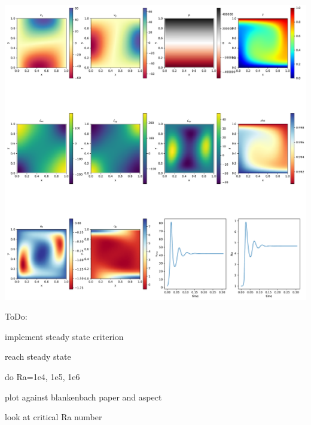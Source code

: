 \includegraphics[width=16cm]{python_codes/fieldstone_convection_box/solution_convection_box.pdf}

ToDo:

implement steady state criterion

reach steady state

do Ra=1e4, 1e5, 1e6

plot against blankenbach paper and aspect

look at critical Ra number
